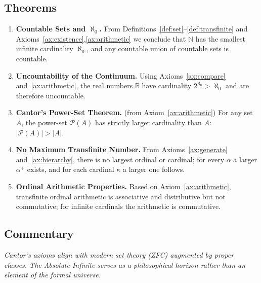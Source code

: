 \documentclass[11pt]{article}
\begin{document}
\subsection*{Theorems}
\begin{enumerate}
  \item \textbf{Countable Sets and $\aleph_0$.} From Definitions~\ref{def:set}--\ref{def:transfinite} and Axioms~\ref{ax:existence},\ref{ax:arithmetic} we conclude that $\mathbb{N}$ has the smallest infinite cardinality $\aleph_0$, and any countable union of countable sets is countable.\label{thm:countable}
  \item \textbf{Uncountability of the Continuum.} Using Axioms~\ref{ax:compare} and~\ref{ax:arithmetic}, the real numbers $\mathbb{R}$ have cardinality $2^{\aleph_0}>\aleph_0$ and are therefore uncountable.\label{thm:continuum}
  \item \textbf{Cantor's Power-Set Theorem.} (from Axiom~\ref{ax:arithmetic}) For any set $A$, the power-set $\mathcal{P}(A)$ has strictly larger cardinality than $A$: $|\mathcal{P}(A)|>|A|$.\label{thm:powerset}
  \item \textbf{No Maximum Transfinite Number.} From Axioms~\ref{ax:generate} and~\ref{ax:hierarchy}, there is no largest ordinal or cardinal; for every $\alpha$ a larger $\alpha^+$ exists, and for each cardinal $\kappa$ a larger one follows.\label{thm:nomax}
  \item \textbf{Ordinal Arithmetic Properties.} Based on Axiom~\ref{ax:arithmetic}, transfinite ordinal arithmetic is associative and distributive but not commutative; for infinite cardinals the arithmetic is commutative.\label{thm:arith}
\end{enumerate}

\subsection*{Commentary}
\textit{Cantor's axioms align with modern set theory (ZFC) augmented by proper classes. The Absolute Infinite serves as a philosophical horizon rather than an element of the formal universe.}
\end{document}
